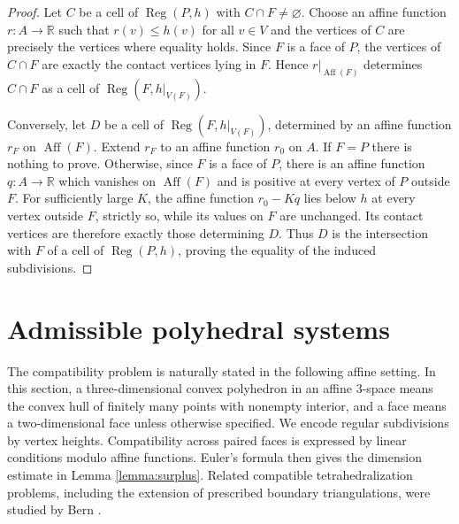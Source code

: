 \documentclass[oneside,a4paper,12pt]{article}
\newcommand{\R}{\mathbb R}
\newcommand{\Aff}{\operatorname{Aff}}
\newcommand{\Reg}{\operatorname{Reg}}
\theoremstyle{plain}
\theoremstyle{definition}
\theoremstyle{remark}
\numberwithin{equation}{section}
\begin{document}
\begin{proof}
Let $C$ be a cell of $\Reg(P,h)$ with $C\cap F\neq\varnothing$. Choose an affine function $r:A\to\R$ such that $r(v)\leq h(v)$ for all $v\in V$ and the vertices of $C$ are precisely the vertices where equality holds. Since $F$ is a face of $P$, the vertices of $C\cap F$ are exactly the contact vertices lying in $F$. Hence $r|_{\Aff(F)}$ determines $C\cap F$ as a cell of $\Reg(F,h|_{V(F)})$.

Conversely, let $D$ be a cell of $\Reg(F,h|_{V(F)})$, determined by an affine function $r_F$ on $\Aff(F)$. Extend $r_F$ to an affine function $r_0$ on $A$. If $F=P$ there is nothing to prove. Otherwise, since $F$ is a face of $P$, there is an affine function $q:A\to\R$ which vanishes on $\Aff(F)$ and is positive at every vertex of $P$ outside $F$. For sufficiently large $K$, the affine function $r_0-Kq$ lies below $h$ at every vertex outside $F$, strictly so, while its values on $F$ are unchanged. Its contact vertices are therefore exactly those determining $D$. Thus $D$ is the intersection with $F$ of a cell of $\Reg(P,h)$, proving the equality of the induced subdivisions.
\end{proof}

\section{Admissible polyhedral systems}\label{section:compatible}

The compatibility problem is naturally stated in the following affine setting. In this section, a three-dimensional convex polyhedron in an affine $3$-space means the convex hull of finitely many points with nonempty interior, and a face means a two-dimensional face unless otherwise specified. We encode regular subdivisions by vertex
heights. Compatibility across paired faces is expressed by linear conditions modulo affine functions. Euler's formula then gives the dimension estimate in Lemma \ref{lemma:surplus}. Related compatible tetrahedralization problems, including the extension of prescribed boundary triangulations, were studied by Bern \cite{Bern}.
\end{document}
